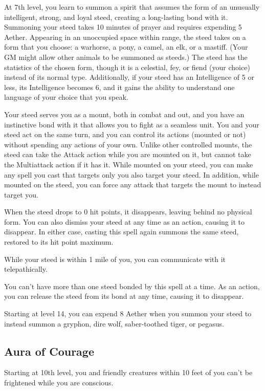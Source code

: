 At 7th level, you learn to summon a spirit that assumes the form of an unusually intelligent, strong, and loyal steed, creating a long-lasting bond with it. Summoning your steed takes 10 minutes of prayer and requires expending 5 Aether. Appearing in an unoccupied space within range, the steed takes on a form that you choose: a warhorse, a pony, a camel, an elk, or a mastiff. (Your GM might allow other animals to be summoned as steeds.) The steed has the statistics of the chosen form, though it is a celestial, fey, or fiend (your choice) instead of its normal type. Additionally, if your steed has an Intelligence of 5 or less, its Intelligence becomes 6, and it gains the ability to understand one language of your choice that you speak.

Your steed serves you as a mount, both in combat and out, and you have an instinctive bond with it that allows you to fight as a seamless unit. You and your steed act on the same turn, and you can control its actions (mounted or not) without spending any actions of your own. Unlike other controlled mounts, the steed can take the Attack action while you are mounted on it, but cannot take the Multiattack action if it has it. While mounted on your steed, you can make any spell you cast that targets only you also target your steed. In addition, while mounted on the steed, you can force any attack that targets the mount to instead target you.

When the steed drops to 0 hit points, it disappears, leaving behind no physical form. You can also dismiss your steed at any time as an action, causing it to disappear. In either case, casting this spell again summons the same steed, restored to its hit point maximum.

While your steed is within 1 mile of you, you can communicate with it telepathically.

You can't have more than one steed bonded by this spell at a time. As an action, you can release the steed from its bond at any time, causing it to disappear.

Starting at level 14, you can expend 8 Aether when you summon your steed to instead summon a gryphon, dire wolf, saber-toothed tiger, or pegasus.

\subsection{Aura of Courage}

Starting at 10th level, you and friendly creatures within 10 feet of you can't be frightened while you are conscious.

